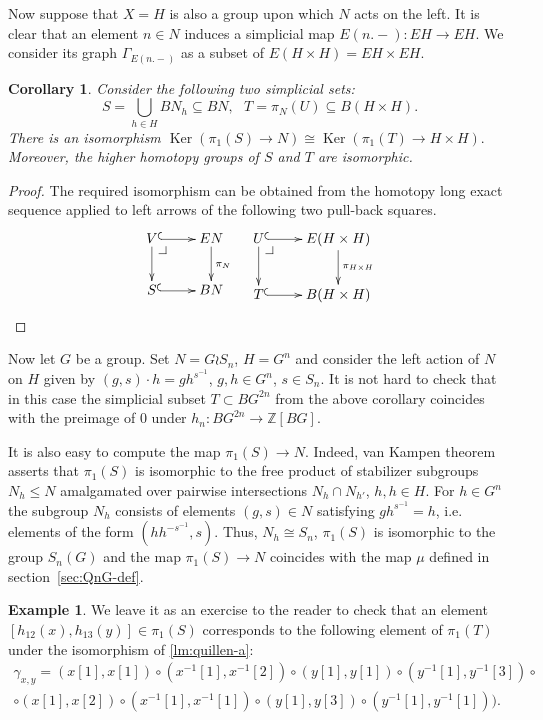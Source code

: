 \documentclass[oneside, 12pt]{amsart}
\makeatletter
\theoremstyle{plain}
\numberwithin{equation}{section}
\numberwithin{lemma}{section}
\newtheorem{cor}[lemma]{Corollary}
\theoremstyle{remark}
\theoremstyle{definition}
\newtheorem{example}[lemma]{Example} \Crefname{example}{Example}{Examples}
\DeclareMathOperator{\Ker}{Ker}
\newcommand{\ZZ}{\mathbb{Z}}
\newcommand{\pullbackcorner}[1][dr]{\save*!/#1-1.2pc/#1:(-1,1)@^{|-}\restore}
\makeatother
\begin{document}
Now suppose that $X=H$ is also a group upon which $N$ acts on the left.
It is clear that an element $n \in N$ induces a simplicial map $E(n.-)\colon EH \to EH$.
We consider its graph $\Gamma_{E(n.-)}$ as a subset of $E(H \times H) = EH \times EH$.

\begin{cor} \label{cor:ker-iso}
Consider the following two simplicial sets:
\[ S = \bigcup\limits_{h\in H} BN_h \subseteq BN,\ \ \ T = \pi_N(U) \subseteq B(H \times H).\]
There is an isomorphism $\Ker(\pi_1(S) \to N) \cong \Ker(\pi_1(T) \to H \times H).$
Moreover, the higher homotopy groups of $S$ and $T$ are isomorphic. \end{cor}
\begin{proof}
The required isomorphism can be obtained from the homotopy long exact sequence applied to left arrows of the following two pull-back squares.
\[ \xymatrix{ V  \ar@{^{(}->}[r] \ar[d] \pullbackcorner & \ar[d]^{\pi_N} EN \\
              S \ar@{^{(}->}[r] & BN } \ \ \ 
   \xymatrix{ U  \ar@{^{(}->}[r] \ar[d] \pullbackcorner & \ar[d]^{\pi_{H \times H}} E(H \times H) \\
              T \ar@{^{(}->}[r] & B(H \times H)}  \] \end{proof}

Now let $G$ be a group. Set $N = G \wr S_n$, $H = G^n$ and consider the left action of $N$ on $H$ given by $(g, s) \cdot h = gh^{s^{-1}}$, $g, h\in G^n$, $s\in S_n$.
It is not hard to check that in this case the simplicial subset $T \subset BG^{2n}$ from the above corollary
 coincides with the preimage of $0$ under $h_n \colon BG^{2n} \to \ZZ[BG]$.

It is also easy to compute the map $\pi_1(S) \to N$. Indeed, van Kampen theorem~\cite[Theorem~2.7]{May99} asserts that
$\pi_1(S)$ is isomorphic to the free product of stabilizer subgroups $N_{h} \leq N$ amalgamated over pairwise intersections $N_h \cap N_{h'}$, $h, h\in H$.
For $h \in G^n$ the subgroup $N_h$ consists of elements $(g, s) \in N$ satisfying $gh^{s^{-1}} = h$, i.e. elements of the form $(hh^{-s^{-1}}, s)$.
Thus, $N_h\cong S_n$, $\pi_1(S)$ is isomorphic to the group $S_n(G)$ and the map $\pi_1(S) \to N$ coincides with the map $\mu$ defined in section~\ref{sec:QnG-def}.

\begin{example} \label{ex44}
 We leave it as an exercise to the reader to check that an element $[h_{12}(x), h_{13}(y)] \in \pi_1(S)$ corresponds to the following element of $\pi_1(T)$
  under the isomorphism of \cref{lm:quillen-a}:
 \begin{multline} \label{eq:pathT}
  \gamma_{x,y} = (x[1], x[1]) \circ (x^{-1}[1], x^{-1}[2]) \circ (y[1], y[1]) \circ (y^{-1}[1], y^{-1}[3]) \circ \\ \circ (x[1], x[2]) \circ (x^{-1}[1], x^{-1}[1]) \circ (y[1], y[3]) \circ (y^{-1}[1], y^{-1}[1])).
 \end{multline}  
\end{example}
\end{document}
